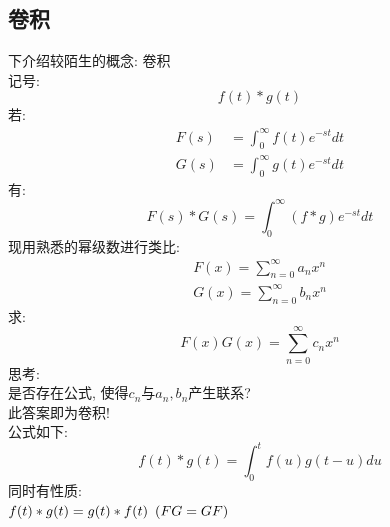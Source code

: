 \subsection{\LARGE \hspace*{0.1em}卷积}
下介绍较陌生的概念: 卷积  \\
记号:
\[ f(t) \ast g(t) \]
若:
\begin{align*}
   F(s) &= \int_0^\infty f(t) e^{-st} dt \\
   G(s) &= \int_0^\infty g(t) e^{-st} dt
\end{align*} 
有:
\[ F(s) \ast G(s) = \int_0^\infty (f \ast g) e^{-st} dt \]
现用熟悉的幂级数进行类比:
\begin{align*}
   F(x) = \sum_{n=0}^\infty a_n x^n \\
   G(x) = \sum_{n=0}^\infty b_n x^n
\end{align*}
求:
\[ F(x) G(x) = \sum_{n=0}^\infty c_n x^n \]
思考:\\
是否存在公式, 使得$c_n$与$a_n, b_n$产生联系?\\
此答案即为卷积!\\
公式如下:
\[ f(t) \ast g(t) = \int_0^t f(u) g(t-u) du \]
同时有性质:\\
$f(t) \ast g(t) = g(t) \ast f(t)   \hspace*{0.5em} (F G = G F)$

